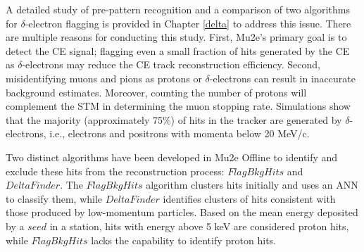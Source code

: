 A detailed study of pre-pattern recognition and a comparison of two algorithms for 
$\delta$-electron flagging is provided in Chapter \ref{delta} to address this issue. 
There are multiple reasons for conducting this study. First, Mu2e's primary goal is 
to detect the CE signal; flagging even a small fraction of hits generated 
by the CE as $\delta$-electrons may reduce the CE track reconstruction efficiency. 
Second, misidentifying muons and pions as protons or $\delta$-electrons 
can result in inaccurate background estimates. Moreover, counting the 
number of protons will complement the STM in determining the muon stopping rate. 
Simulations show that the majority (approximately 75\%) of hits in the tracker 
are generated by $\delta$-electrons, i.e., electrons and positrons with momenta below 20 MeV/c.

Two distinct algorithms have been developed in Mu2e Offline to identify 
and exclude these hits from the reconstruction process: $FlagBkgHits$ and $DeltaFinder$. 
The $FlagBkgHits$ algorithm clusters hits initially and uses an ANN to classify them, 
while $DeltaFinder$ identifies clusters of hits consistent with those produced by 
low-momentum particles. Based on the mean energy deposited by a $seed$ in a station, 
hits with energy above 5 keV are considered proton hits, while $FlagBkgHits$ lacks the 
capability to identify proton hits.


